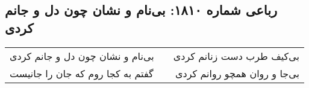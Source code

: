 \begin{center}
\section*{رباعی شماره ۱۸۱۰: بی‌نام و نشان چون دل و جانم کردی}
\label{sec:1810}
\begin{longtable}{l p{0.5cm} r}
بی‌نام و نشان چون دل و جانم کردی
&&
بی‌کیف طرب دست زنانم کردی
\\
گفتم به کجا روم که جان را جانیست
&&
بی‌جا و روان همچو روانم کردی
\\
\end{longtable}
\end{center}
